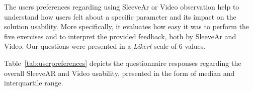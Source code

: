 \begin{table}[!t]
\centering
{}
\caption{Questionnaire results}
\label{tab:userpreferences}
\end{table}


The users preferences regarding using SleeveAr or Video observation help to understand how users felt about a specific parameter and its impact on the solution usability. 
More specifically, it evaluates how easy it was to perform the five exercises and to interpret the provided feedback, both by SleeveAr and Video.
Our questions were presented in a \textit{Likert} scale of 6 values.

Table~\ref{tab:userpreferences} depicts the questionnaire responses regarding the overall SleeveAR and Video usability, presented in the form of median and interquartile range. 

